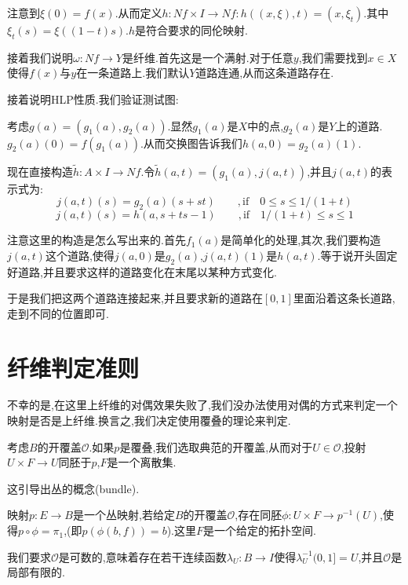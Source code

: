 注意到$\xi(0)=f(x)$.从而定义$h: Nf \times I \to Nf:h((x,\xi),t)=(x,\xi_t)$.其中$\xi_t(s)=\xi((1-t)s)$.$h$是符合要求的同伦映射.

接着我们说明$\omega:Nf \to Y$是纤维.首先这是一个满射.对于任意$y$,我们需要找到$x\in X$使得$f(x)$与$y$在一条道路上.我们默认$Y$道路连通,从而这条道路存在.

接着说明HLP性质.我们验证测试图:

考虑$g(a)=(g_1(a),g_2(a))$.显然$g_1(a)$是$X$中的点,$g_2(a)$是$Y$上的道路.$g_2(a)(0)=f(g_1(a))$.从而交换图告诉我们$h(a,0)=g_2(a)(1)$.

现在直接构造$\tilde{h}:A \times I \to Nf$.令$\tilde{h}(a,t)=(g_1(a),j(a,t))$,并且$j(a,t)$的表示式为:
$$
j(a,t)(s)=g_2(a)(s+st) \quad \quad ,\mathrm{if} \quad 0\leq s \leq 1/(1+t) 
$$
$$
j(a,t)(s)=h(a,s+ts-1) \quad \quad ,\mathrm{if} \quad 1/(1+t)\leq s \leq 1
$$

注意这里的构造是怎么写出来的.首先$f_1(a)$是简单化的处理,其次,我们要构造$j(a,t)$这个道路,使得$j(a,0)$是$g_2(a)$,$j(a,t)(1)$是$h(a,t)$.等于说开头固定好道路,并且要求这样的道路变化在末尾以某种方式变化.

于是我们把这两个道路连接起来,并且要求新的道路在$[0,1]$里面沿着这条长道路,走到不同的位置即可.

\section{纤维判定准则}
不幸的是,在这里上纤维的对偶效果失败了,我们没办法使用对偶的方式来判定一个映射是否是上纤维.换言之,我们决定使用覆叠的理论来判定.

考虑$B$的开覆盖$\mathcal{O}$.如果$p$是覆叠,我们选取典范的开覆盖,从而对于$U \in \mathcal{O}$,投射$U \times F \to U$同胚于$p$,$F$是一个离散集.

这引导出丛的概念(bundle).
\begin{definition}
    映射$p:E \to B$是一个丛映射,若给定$B$的开覆盖$\mathcal{O}$,存在同胚$\phi: U \times F \to p^{-1}(U)$,使得$p \circ \phi=\pi_1$,(即$p(\phi(b,f))=b$).这里$F$是一个给定的拓扑空间.

    我们要求$\mathcal{O}$是可数的,意味着存在若干连续函数$\lambda_U:B \to I$使得$\lambda_U^{-1}(0,1]=U$,并且$\mathcal{O}$是局部有限的.
\end{definition}
 
